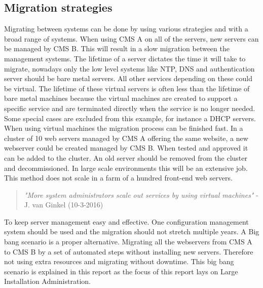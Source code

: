 \subsection{Migration strategies}\label{subsec:migrationstrategies}
Migrating between systems can be done by using various strategies and with a broad range of systems. When using CMS A on all of the servers, new servers can be managed by CMS B. This will result in a slow migration between the management systems. The lifetime of a server dictates the time it will take to migrate, nowadays only the low level systems like NTP, DNS and authentication server should be bare metal servers. All other services depending on these could be virtual. The lifetime of these virtual servers is often less than the lifetime of bare metal machines because the virtual machines are created to support a specific service and are terminated directly when the service is no longer needed. Some special cases are excluded from this example, for instance a DHCP servers. When using virtual machines the migration process can be finished fast. In a cluster of 10 web servers managed by CMS A offering the same website, a new webserver could be created managed by CMS B. When tested and approved it can be added to the cluster. An old server should be removed from the cluster and decommissioned. In large scale environments this will be an extensive job. This method does not scale in a farm of a hundred front-end web servers.

\begin{quote}
\label{quote}
\textit{"More system administrators scale out services by using virtual machines"} - J. van Ginkel (10-3-2016)
\end{quote}

To keep server management easy and effective. One configuration management system should be used and the migration should not stretch multiple years. A Big bang scenario is a proper alternative. Migrating all the webservers from CMS A to CMS B by a set of automated steps without installing new servers. Therefore not using extra resources and migrating without downtime. This big bang scenario \cite{bigbang} is explained in this report as the focus of this report lays on Large Installation Administration.
